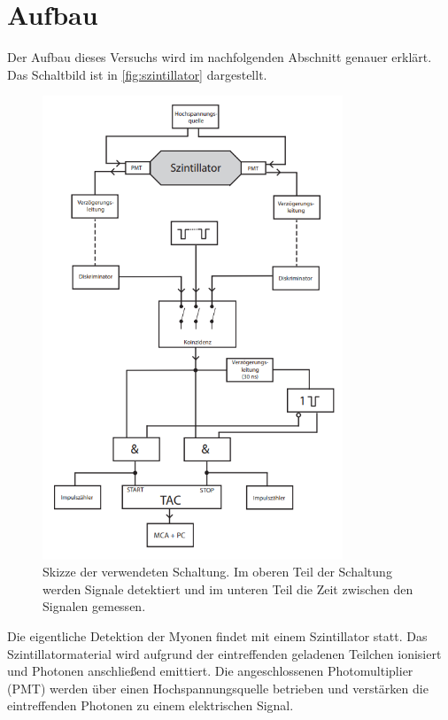 \section{Aufbau}
\label{sec:aufbau}

Der Aufbau dieses Versuchs wird im nachfolgenden Abschnitt genauer erklärt.
Das Schaltbild ist in \autoref{fig:szintillator} dargestellt.
\begin{figure}
    \centering
    \includegraphics[width=0.8\textwidth]{content/images/szintillator.png}
    \caption{Skizze der verwendeten Schaltung. Im oberen Teil der Schaltung werden Signale detektiert und im unteren Teil die Zeit zwischen den Signalen gemessen. \cite{V01}}
    \label{fig:szintillator}
\end{figure}
Die eigentliche Detektion der Myonen findet mit einem Szintillator statt.
Das Szintillatormaterial wird aufgrund der eintreffenden geladenen Teilchen ionisiert und Photonen anschließend emittiert.
Die angeschlossenen Photomultiplier (PMT) werden über einen Hochspannungsquelle betrieben und verstärken die eintreffenden Photonen zu einem elektrischen Signal.
